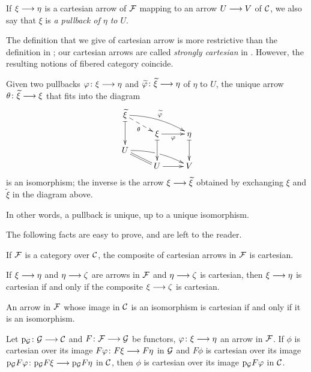 \begin{3   FIBERED CATEGORIES}
\begin{3.1 Fibered categories}
\begin{definition}
If $\xi \arr \eta$ is a cartesian arrow of $\mathcal{F}$ mapping to an arrow $U \arr V$ of $\mathcal{C}$, we also say that $\xi$ is \emph{a pullback of $\eta$ to $U$}.
\end{definition}

\begin{remark}\label{rmk:unique-pullback}
The definition that we give of cartesian arrow is more restrictive than the definition in \cite{sga1};  our cartesian arrows are called \emph{strongly cartesian} in \cite{gray-fibered}. However, the resulting notions of fibered category coincide.
\end{remark}


\begin{remark}
Given two pullbacks $\phi\colon \xi \arr \eta$ and $\widetilde\phi \colon \widetilde\xi \arr \eta $ of $\eta$ to $U$, the unique arrow $\theta\colon \widetilde \xi \arr \xi$ that fits into the diagram
   \[
   \xymatrix@R=6pt{
   {\widetilde\xi}\ar@{|->}[dd]\ar@{-->}[rd]_\theta
   \ar@/^/[rrd]^{\widetilde\phi} \\
   & {}\xi\ar@{|->}[dd]\ar[r]_{\phi}
   &{}\eta\ar@{|->}[dd] \\
   U\ar@{=}[rd]\ar@/^/[rrd]|(.482)\hole\\
   & U \ar[r] & V
   }
   \]
is an isomorphism; the inverse is the arrow $\xi \arr \widetilde{\xi}$ obtained by exchanging $\xi$ and $\widetilde{\xi}$ in the diagram above.

In other words, a pullback is unique, up to a unique isomorphism.
\end{remark}

The following facts are easy to prove, and are left to the reader.

\begin{proposition}
\hfil
\begin{enumeratei}

 If $\mathcal{F}$ is a category over $\mathcal{C}$, the composite of cartesian arrows in $\mathcal{F}$ is cartesian.

 If $\xi \arr \eta$ and $\eta \arr \zeta$ are arrows in $\mathcal{F}$ and $\eta \arr\zeta$ is cartesian, then $\xi \arr\eta$ is cartesian if and only if the composite $\xi \arr \zeta$ is cartesian.

 An arrow in $\mathcal{F}$ whose image in $\mathcal{C}$ is an isomorphism is cartesian if and only if it is an isomorphism.

 Let $\p_{\cG}\colon \cG \arr \cC$ and $F \colon \cF \arr \cG$ be functors, $\phi \colon \xi \arr \eta$ an arrow in $\mathcal{F}$. If $\phi$ is cartesian over its image $F \phi \colon F \xi \arr F \eta$ in $\mathcal{G}$ and $F \phi$ is cartesian over its image $\p_{\cG}F\phi \colon \p_{\cG}F\xi \arr \p_{\cG}F \eta$ in $\mathcal{C}$, then $\phi$ is cartesian over its image $\mathrm{p}_{\mathcal{G}}F\varphi$ in $\mathcal{C}$.
\end{enumeratei}
\end{proposition}


\end{3.1 Fibered categories}
\end{3   FIBERED CATEGORIES}

